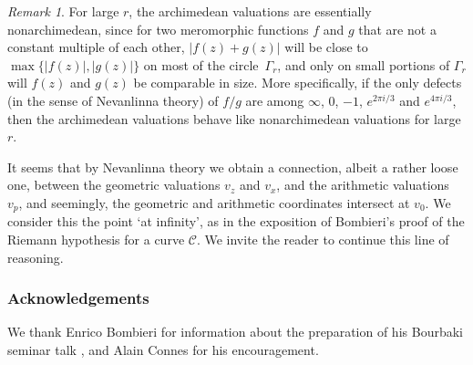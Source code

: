 \documentclass{amsart}
\newcommand\Curve{\mathcal{C}}
\theoremstyle{definition}\newtheorem{definition}[theorem]{Definition}
\theoremstyle{remark}\newtheorem{remark}[theorem]{Remark}
\numberwithin{equation}{section}
\begin{document}
\begin{remark}
For large $r$,
the archimedean valuations are essentially nonarchimedean,
since for two meromorphic functions $f$ and $g$ that are not a constant multiple of each other,
$|f(z)+g(z)|$ will be close to $\max\{|f(z)|,|g(z)|\}$ on most of the circle~$\Gamma_r$,
and only on small portions of $\Gamma_r$ will $f(z)$ and $g(z)$ be comparable in size.
More specifically,
if the only defects (in the sense of Nevanlinna theory) of $f/g$ are among $\infty$, $0$, $-1$, $e^{2\pi i/3}$ and $e^{4\pi i/3}$,
then the archimedean valuations behave like nonarchimedean valuations for large $r$.
\end{remark}

It seems that by Nevanlinna theory we obtain a connection,
albeit a rather loose one,
between the geometric valuations $v_z$ and $v_{x}$,
and the arithmetic valuations~$v_p$,
and seemingly,
the geometric and arithmetic coordinates intersect at $v_{0}$.
We consider this the point `at infinity',
as in the exposition of Bombieri's proof of the Riemann hypothesis for a curve $\Curve$.
We invite the reader to continue this line of reasoning.

\subsubsection*{Acknowledgements}

We thank Enrico Bombieri for information about the preparation of his Bourbaki seminar talk \cite{Bo},
and Alain Connes for his encouragement.
\end{document}
